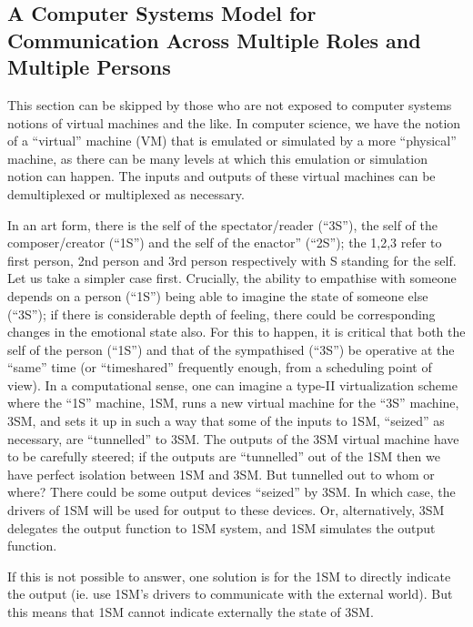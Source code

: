 \subsection{A Computer Systems Model for Communication Across Multiple Roles and Multiple Persons}\label{chap3-sec4.2}

This section can be skipped by those who are not exposed to computer systems notions of virtual machines and the like. In computer science, we have the notion of a “virtual” machine (VM) that is emulated or simulated by a more “physical” machine, as there can be many levels at which this emulation or simulation notion can happen. The inputs and outputs of these virtual machines can be demultiplexed or multiplexed as necessary.

In an art form, there is the self of the spectator/reader (“3S”), the self of the composer/creator (“1S”) and the self of the enactor” (“2S”); the 1,2,3 refer to first person, 2nd person and 3rd person respectively with S standing for the self. Let us take a simpler case first. Crucially, the ability to empathise with someone depends on a person (“1S”) being able to imagine the state of someone else (“3S”); if there is considerable depth of feeling, there could be corresponding changes in the emotional state also. For this to happen, it is critical that both the self of the person (“1S”) and that of the sympathised (“3S”) be operative at the “same” time (or “timeshared” frequently enough, from a scheduling point of view). In a computational sense, one can imagine a type-II virtualization scheme where the “1S” machine, 1SM, runs a new virtual machine for the “3S” machine, 3SM, and sets it up in such a way that some of the inputs to 1SM, “seized” as necessary, are “tunnelled” to 3SM. The outputs of the 3SM virtual machine have to be carefully steered; if the outputs are “tunnelled” out of the 1SM then we have perfect isolation between 1SM and 3SM. But tunnelled out to whom or where? There could be some output devices “seized” by 3SM. In which case, the drivers of 1SM will be used for output to these devices. Or, alternatively, 3SM delegates the output function to 1SM system, and 1SM simulates the output function.

If this is not possible to answer, one solution is for the 1SM to directly indicate the output (ie. use 1SM’s drivers to communicate with the external world). But this means that 1SM cannot indicate externally the state of 3SM. 

